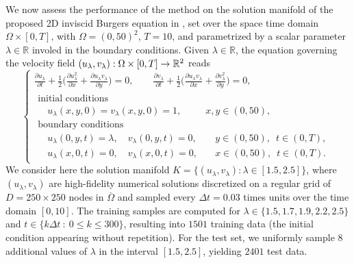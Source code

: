 We now assess the performance of the method on the solution manifold of the proposed 2D inviscid Burgers equation in \cite{Barnett2023Nov}, set over the space time domain $\Omega \times [0,T]$, with $\Omega = (0, 50)^2$, $T = 10$, and parametrized by a scalar parameter $\lambda \in \mathbb R$ involed in the boundary conditions.
Given $\lambda \in \mathbb R$, the equation governing the velocity field $(u_\lambda, v_\lambda) : \Omega \times [0,T] \rightarrow \mathbb{R}^2$ reads
\begin{equation*}
    \left\{ 
    \begin{array}{l}
        \displaystyle
        \frac{\partial u_\lambda}{\partial t} + \frac{1}{2} \Big( \frac{\partial u_\lambda^2}{\partial x} + \frac{\partial u_\lambda v_\lambda}{\partial y}  \Big) = 0, 
        \qquad 
        \displaystyle 
        \frac{\partial v_\lambda}{\partial t} + \frac{1}{2} \Big(\frac{\partial u_\lambda v_\lambda}{\partial x} + \frac{\partial v_\lambda^2}{\partial y} \Big) = 0,
        \\[15pt]
        \begin{array}{ll}
            \text{initial conditions} &
            \\
            \quad u_\lambda(x, y, 0) = v_\lambda(x, y, 0) = 1, & x, y \in (0, 50),
            \\[8pt]
            \text{boundary conditions} &
            \\ 
            \quad u_\lambda(0, y, t) = \lambda, \quad v_\lambda(0, y, t) = 0, & \quad y \in (0, 50), \enspace t \in (0, T), 
            \\[5pt]
            \quad u_\lambda(x, 0, t) = 0, \quad v_\lambda(x, 0, t) = 0, & \quad x \in (0, 50), \enspace t \in (0, T).
        \end{array}
    \end{array}
    \right.
\end{equation*}
We consider here the solution manifold $ K = \big\{  (u_\lambda, v_\lambda): \lambda \in [1.5, 2.5] \big\} $, where $(u_\lambda, v_\lambda)$ are high-fidelity numerical solutions discretized on a regular grid of $ D = 250 \times 250 $ nodes in $\overline \Omega$ and sampled every $\Delta t = 0.03$ times units over the time domain $[0, 10]$.
The training samples are computed for $\lambda \in \{1.5, 1.7, 1.9, 2.2, 2.5\}$ and $t \in \{ k \Delta t \: : \: 0 \leq k \leq 300 \}$, resulting into $1501$ training data (the initial condition appearing without repetition).
For the test set, we uniformly sample $8$ additional values of $\lambda$ in the interval $[1.5, 2.5] $, yielding $2401$ test data.
 
